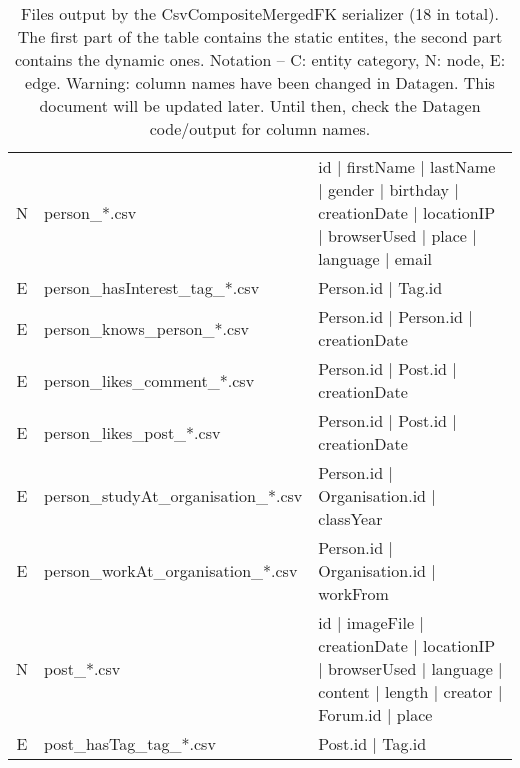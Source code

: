 \begin{table}[htb]
{\begin{tabular}{|c|l|l|}
            \hline
            N                    & person\_*.csv                        & id | firstName | lastName | gender | birthday | creationDate | locationIP | browserUsed | place | language | email  \\
            E                    & person\_hasInterest\_tag\_*.csv      & Person.id | Tag.id                                                                                                  \\
            E                    & person\_knows\_person\_*.csv         & Person.id | Person.id | creationDate                                                                                \\
            E                    & person\_likes\_comment\_*.csv        & Person.id | Post.id | creationDate                                                                                  \\
            E                    & person\_likes\_post\_*.csv           & Person.id | Post.id | creationDate                                                                                  \\
            E                    & person\_studyAt\_organisation\_*.csv & Person.id | Organisation.id | classYear                                                                             \\
            E                    & person\_workAt\_organisation\_*.csv  & Person.id | Organisation.id | workFrom                                                                              \\
            \hline
            N                    & post\_*.csv                          & id | imageFile | creationDate | locationIP | browserUsed | language | content | length | creator | Forum.id | place \\
            E                    & post\_hasTag\_tag\_*.csv             & Post.id | Tag.id                                                                                                    \\
            \hline
        \end{tabular}}
    \caption{Files output by the CsvCompositeMergedFK serializer (18 in total). The first part of the table contains the static entites, the second part contains the dynamic ones. Notation -- C: entity category, N: node, E: edge. Warning: column names have been changed in Datagen. This document will be updated later. Until then, check the Datagen code/output for column names.}
    \label{table:csv-composite-mergedfk}
\end{table}
